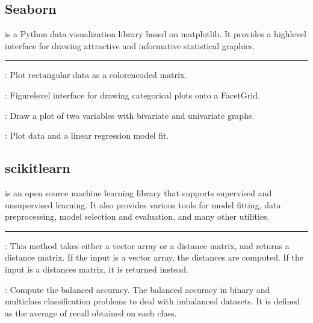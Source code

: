 \documentclass[letterpaper,10pt,english]{sphinxmanual}
\begin{document}
\subsection{Seaborn}
\label{\detokenize{content/Glossary:seaborn}}
 is a Python data visualization library based on matplotlib. It provides a high\sphinxhyphen{}level interface for drawing attractive and informative statistical graphics.



\bigskip\hrule\bigskip


: Plot rectangular data as a color\sphinxhyphen{}encoded matrix.

: Figure\sphinxhyphen{}level interface for drawing categorical plots onto a FacetGrid.

: Draw a plot of two variables with bivariate and univariate graphs.

: Plot data and a linear regression model fit.


\subsection{scikit\sphinxhyphen{}learn}
\label{\detokenize{content/Glossary:scikit-learn}}
 is an open source machine learning library that supports supervised and unsupervised learning. It also provides various tools for model fitting, data preprocessing, model selection and evaluation, and many other utilities.


\bigskip\hrule\bigskip


: This method takes either a vector array or a distance matrix, and returns a distance matrix. If the input is a vector array, the distances are computed. If the input is a distances matrix, it is returned instead.

: Compute the balanced accuracy. The balanced accuracy in binary and multiclass classification problems to deal with imbalanced datasets. It is defined as the average of recall obtained on each class.
\end{document}
